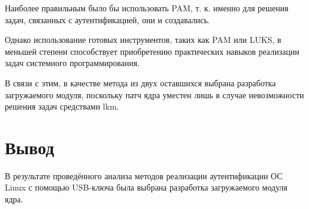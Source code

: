 Наиболее правильным было бы использовать PAM, т. к. именно для решения задач, связанных с аутентификацией, они и создавались.

Однако использование готовых инструментов, таких как PAM или LUKS, в меньшей степени способствует приобретению практических навыков реализации задач системного программирования.

В связи с этим, в качестве метода из двух оставшихся выбрана разработка загружаемого модуля, поскольку патч ядра уместен лишь в случае невозможности решения задач средствами lkm.

\section*{Вывод}

В результате проведённого анализа методов реализации аутентификации ОС Linux с помощью USB-ключа была выбрана разработка загружаемого модуля ядра.